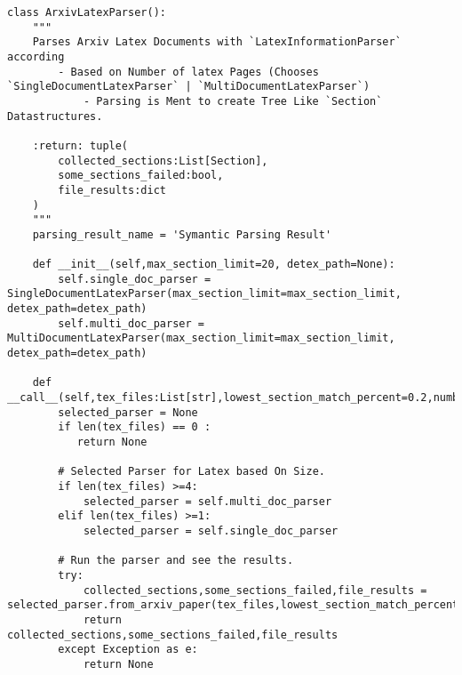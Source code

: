 \begin{lstlisting}
class ArxivLatexParser():
    """
    Parses Arxiv Latex Documents with `LatexInformationParser` according 
        - Based on Number of latex Pages (Chooses `SingleDocumentLatexParser` | `MultiDocumentLatexParser`)
            - Parsing is Ment to create Tree Like `Section` Datastructures.  
    
    :return: tuple(
        collected_sections:List[Section],
        some_sections_failed:bool,
        file_results:dict
    )
    """
    parsing_result_name = 'Symantic Parsing Result'

    def __init__(self,max_section_limit=20, detex_path=None):
        self.single_doc_parser = SingleDocumentLatexParser(max_section_limit=max_section_limit, detex_path=detex_path)
        self.multi_doc_parser = MultiDocumentLatexParser(max_section_limit=max_section_limit, detex_path=detex_path)
    
    def __call__(self,tex_files:List[str],lowest_section_match_percent=0.2,number_to_tries=10):
        selected_parser = None
        if len(tex_files) == 0 : 
           return None
        
        # Selected Parser for Latex based On Size.            
        if len(tex_files) >=4:
            selected_parser = self.multi_doc_parser
        elif len(tex_files) >=1:
            selected_parser = self.single_doc_parser
        
        # Run the parser and see the results. 
        try:
            collected_sections,some_sections_failed,file_results = selected_parser.from_arxiv_paper(tex_files,lowest_section_match_percent=lowest_section_match_percent,number_to_tries=number_to_tries)
            return collected_sections,some_sections_failed,file_results
        except Exception as e:
            return None
        
      

\end{lstlisting}

